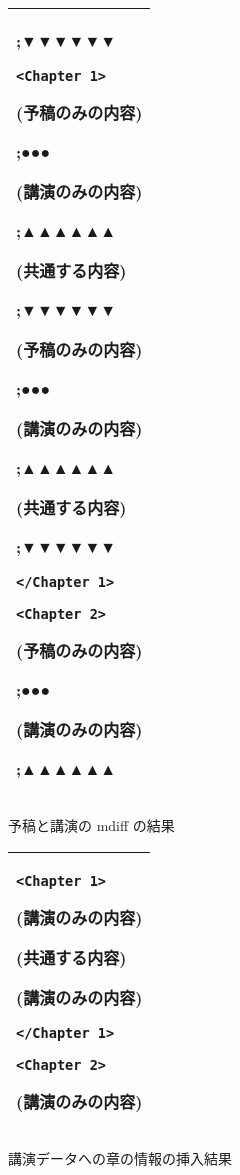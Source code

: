 \begin{figure}[t]
  \begin{center}
    \leavevmode

    \begin{tabular}[h]{|l|}\hline
{\begin{minipage}[h]{4cm}
;▼▼▼▼▼▼

\verb+<Chapter 1>+

(予稿のみの内容)

;●●●

(講演のみの内容)

;▲▲▲▲▲▲

(共通する内容)

;▼▼▼▼▼▼

(予稿のみの内容)

;●●●

(講演のみの内容)

;▲▲▲▲▲▲

(共通する内容)

;▼▼▼▼▼▼

\verb+</Chapter 1>+

\verb+<Chapter 2>+

(予稿のみの内容)

;●●●

(講演のみの内容)

;▲▲▲▲▲▲
\end{minipage}}\\\hline
\end{tabular}

\caption{予稿と講演の mdiff の結果}
\label{tab:youkou_mdiff}
\end{center}
\end{figure}

\begin{figure}[t]
  \begin{center}
    \leavevmode

    \begin{tabular}[h]{|l|}\hline
{\begin{minipage}[h]{4cm}
\verb+<Chapter 1>+

(講演のみの内容)

(共通する内容)

(講演のみの内容)

\verb+</Chapter 1>+

\verb+<Chapter 2>+

(講演のみの内容)

\end{minipage}}\\\hline
\end{tabular}

\caption{講演データへの章の情報の挿入結果}
\label{tab:youkou_mdiff2}
\end{center}
\end{figure}

